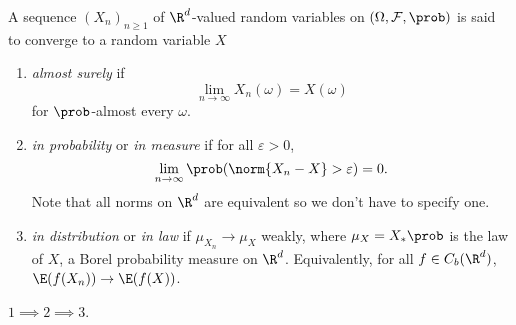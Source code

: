 \documentclass[a4paper]{article}
\renewcommand{\P}{\prob} %
\begin{document}
\begin{definition}
  A sequence \((X_n)_{n \geq 1}\) of \(\R^d\)-valued random variables on \((\Omega, \mathcal F, \P)\) is said to converge to a random variable \(X\)
  \begin{enumerate}
  \item \emph{almost surely} if
    \[
      \lim_{n \to \infty} X_n(\omega) = X(\omega)
    \]
    for \(\P\)-almost every \(\omega\).
  \item \emph{in probability} or \emph{in measure} if for all \(\varepsilon > 0\),
    \[
      \lim_{n \to \infty} \P(\norm{X_n - X} > \varepsilon) = 0.
    \]
    Note that all norms on \(\R^d\) are equivalent so we don't have to specify one.
  \item \emph{in distribution} or \emph{in law} if \(\mu_{X_n} \to \mu_X\) weakly, where \(\mu_X = X_*\P\) is the law of \(X\), a Borel probability measure on \(\R^d\). Equivalently, for all \(f \in C_b(\R^d)\), \(\E(f(X_n)) \to \E(f(X))\).
  \end{enumerate}
\end{definition}

\begin{proposition}
  \(1 \implies 2 \implies 3\).
\end{proposition}
\end{document}
